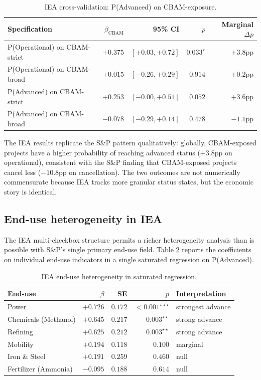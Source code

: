 \documentclass[11pt,a4paper]{article}
\begin{document}
\begin{table}[ht]
\centering
\caption{IEA cross-validation: P(Advanced) on CBAM-exposure.}
\label{tab:ch8-iea-replication}
\begin{tabular}{lrrrr}
\toprule
Specification & $\beta_{\text{CBAM}}$ & 95\% CI & $p$ & Marginal $\Delta p$ \\
\midrule
P(Operational) on CBAM-strict        & $+0.375$ & $[+0.03, +0.72]$ & $0.033^{\star}$ & $+3.8$pp \\
P(Operational) on CBAM-broad         & $+0.015$ & $[-0.26, +0.29]$ & $0.914$         & $+0.2$pp \\
P(Advanced) on CBAM-strict           & $+0.253$ & $[-0.00, +0.51]$ & $0.052$         & $+3.6$pp \\
P(Advanced) on CBAM-broad            & $-0.078$ & $[-0.29, +0.14]$ & $0.478$         & $-1.1$pp \\
\bottomrule
\end{tabular}
\end{table}

The IEA results replicate the S\&P pattern qualitatively: globally, CBAM-exposed projects have a higher probability of reaching advanced status ($+3.8$pp on operational), consistent with the S\&P finding that CBAM-exposed projects cancel less ($-10.8$pp on cancellation). The two outcomes are not numerically commensurate because IEA tracks more granular status states, but the economic story is identical.

\subsection{End-use heterogeneity in IEA}

The IEA multi-checkbox structure permits a richer heterogeneity analysis than is possible with S\&P's single primary end-use field. Table \ref{tab:ch8-iea-heterogeneity} reports the coefficients on individual end-use indicators in a single saturated regression on P(Advanced).

\begin{table}[ht]
\centering
\caption{IEA end-use heterogeneity in saturated regression.}
\label{tab:ch8-iea-heterogeneity}
\begin{tabular}{lrrrl}
\toprule
End-use & $\beta$ & SE & $p$ & Interpretation \\
\midrule
Power                & $+0.726$ & $0.172$ & $<0.001^{\star\star\star}$ & strongest advance \\
Chemicals (Methanol) & $+0.645$ & $0.217$ & $0.003^{\star\star}$       & strong advance \\
Refining             & $+0.625$ & $0.212$ & $0.003^{\star\star}$       & strong advance \\
Mobility             & $+0.194$ & $0.118$ & $0.100$                    & marginal \\
Iron \& Steel        & $+0.191$ & $0.259$ & $0.460$                    & null \\
Fertilizer (Ammonia) & $-0.095$ & $0.188$ & $0.614$                    & null \\
\bottomrule
\end{tabular}
\end{table}
\end{document}

